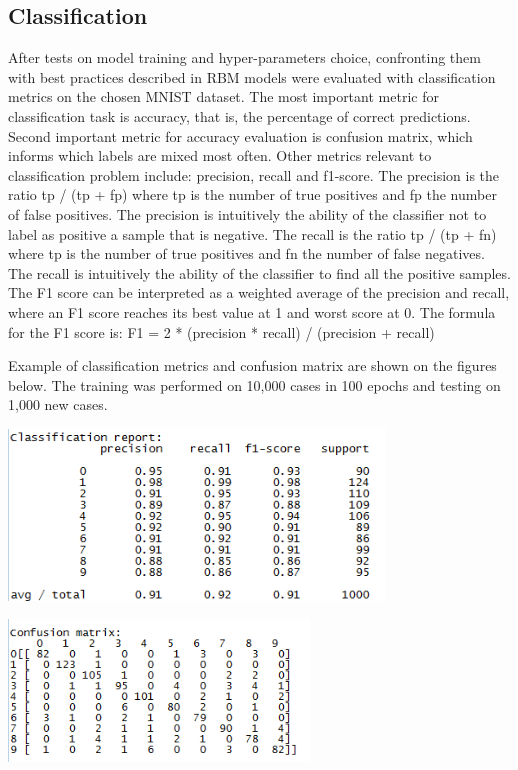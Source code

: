 \documentclass[a4paper]{scrartcl}
\begin{document}
\subsection{Classification}
After tests on model training and hyper-parameters choice, confronting them with best practices described in \cite{Hinton} RBM models were evaluated with classification metrics on the chosen MNIST dataset. The most important metric for classification task is accuracy, that is, the percentage of correct predictions. Second important metric for accuracy evaluation is confusion matrix, which informs which labels are mixed most often. Other metrics relevant to classification problem include: precision, recall and f1-score. The precision is the ratio tp / (tp + fp) where tp is the number of true positives and fp the number of false positives. The precision is intuitively the ability of the classifier not to label as positive a sample that is negative. The recall is the ratio tp / (tp + fn) where tp is the number of true positives and fn the number of false negatives. The recall is intuitively the ability of the classifier to find all the positive samples. The F1 score can be interpreted as a weighted average of the precision and recall, where an F1 score reaches its best value at 1 and worst score at 0. The formula for the F1 score is: \newline 
F1 = 2 * (precision * recall) / (precision + recall)
\par Example of classification metrics and confusion matrix are shown on the figures below. The training was performed on 10,000 cases in 100 epochs and testing on 1,000 new cases.
\begin{center}
\includegraphics[width=10cm]{images/class_metrics.png}
\end{center}
\begin{center}
\includegraphics[width=8cm]{images/conf_matrix.png}
\end{center}
\end{document}
